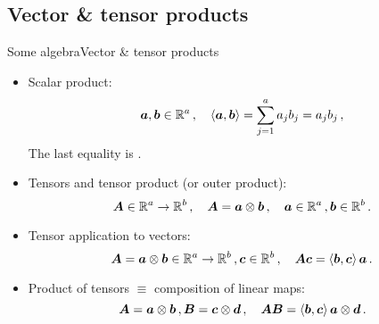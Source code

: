 \subsection{Vector \& tensor products}

\begin{frame}{Some algebra}{Vector \& tensor products}

\begin{itemize}
\item Scalar product:
\begin{displaymath}
\av,\bv\in\Rset^a\,,\quad\scal{\av,\bv}=\sum_{j=1}^a\aj_j\bj_j=\aj_j\bj_j\,,
\end{displaymath}
The last equality is .
\item Tensors and tensor product (or outer product):
\begin{displaymath}
\Av\in\Rset^a\to\Rset^b\,,\quad\Av=\av\otimes\bv\,,\quad\av\in\Rset^a\,,\bv\in\Rset^b\,.
\end{displaymath}
\item Tensor application to vectors:
\begin{displaymath}
\Av=\av\otimes\bv\in\Rset^a\to\Rset^b\,,\cv\in\Rset^b\,,\quad\Av\cv=\scal{\bv,\cv}\av\,.
\end{displaymath}
\item Product of tensors $\equiv$ composition of linear maps:
\begin{displaymath}
\Av=\av\otimes\bv\,,\Bv=\cv\otimes\dv\,,\quad\Av\Bv=\scal{\bv,\cv}\av\otimes\dv\,.
\end{displaymath}
\end{itemize}

\end{frame}

